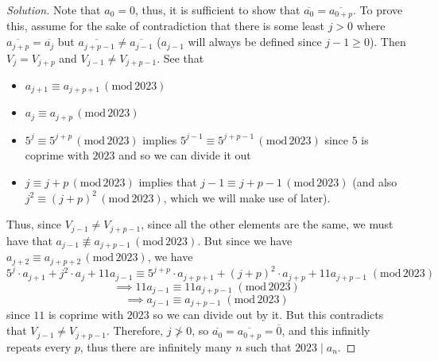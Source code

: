 \documentclass{article}
\begin{document}
\begin{proof}[Solution]
	Note that $a_0 = 0$, thus, it is sufficient to show that
	$\overline{a_0} = \overline{a_{0+p}}$.
	To prove this, assume for the sake of contradiction that there
	is some least $j > 0$ where $\overline{a_{j+p}} = \overline{a_j}$
	but $\overline{a_{j+p-1}} \neq \overline{a_{j-1}}$
	($a_{j-1}$ will always be defined since $j-1 \geq 0$).
	Then $V_j = V_{j+p}$ and $V_{j-1} \neq V_{j + p - 1}$.
	See that
	\begin{itemize}
		\item $a_{j+1} \equiv a_{j+p+1} \, (\mathrm{mod}\, 2023)$
		\item $a_{j} \equiv a_{j+p} \, (\mathrm{mod}\, 2023)$
		\item $5^{j} \equiv 5^{j+p} \, (\mathrm{mod}\, 2023)$
			implies $5^{j-1} \equiv 5^{j+p-1} \, (\mathrm{mod}\, 2023)$
			since $5$ is coprime with $2023$ and so we can divide it out
		\item $j \equiv j+p \, (\mathrm{mod}\, 2023)$
			implies that  $j-1 \equiv j+p-1 \, (\mathrm{mod}\, 2023)$
			(and also $j^2 \equiv (j+p)^2 \,(\mathrm{mod}\, 2023)$,
			which we will make use of later).
	\end{itemize}
	Thus, since $V_{j-1} \neq V_{j + p - 1}$,
	since all the other elements are the same,
	we must have that $a_{j-1} \not\equiv a_{j+p-1}\,(\mathrm{mod}\,2023)$.
	But since we have $a_{j+2} \equiv a_{j+p+2} \, (\mathrm{mod}\, 2023)$,
	we have
	\[
		5^j\cdot a_{j+1} + j^2\cdot a_j + 11a_{j-1}
		\equiv 5^{j+p}\cdot a_{j+p+1} + (j+p)^2\cdot a_{j+p} + 11a_{j+p-1}
		\;(\mathrm{mod}\,2023)
	\]
	\[
		\implies 11a_{j-1} \equiv 11a_{j+p-1}\;(\mathrm{mod}\,2023)
	\]
	\[
		\implies a_{j-1} \equiv a_{j+p-1}\;(\mathrm{mod}\,2023)
	\]
	since $11$ is coprime with $2023$ so we can divide out by it.
	But this contradicts that $V_{j-1} \neq V_{j + p - 1}$.
	Therefore, $j\not>0$,
	so $\overline{a_0} = \overline{a_{0+p}} = \overline{0}$,
	and this infinitly repeats every $p$,
	thus there are infinitely many $n$ such that $2023 \mid a_n$.
\end{proof}
\clearpage
\end{document}
